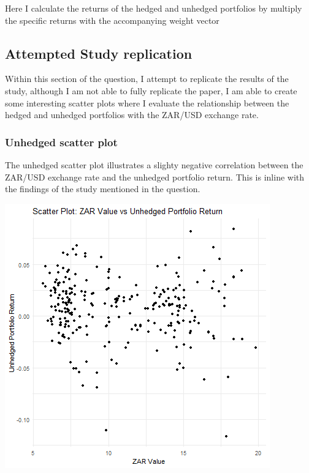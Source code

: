 \documentclass[11pt,preprint, authoryear]{elsarticle}
\let\origfigure\figure
\let\endorigfigure\endfigure
\renewenvironment{figure}[1][2] {
    \expandafter\origfigure\expandafter[H]
} {
    \endorigfigure
}
\numberwithin{equation}{section}
\numberwithin{figure}{section}
\numberwithin{table}{section}
\begin{document}
Here I calculate the returns of the hedged and unhedged portfolios by
multiply the specific returns with the accompanying weight vector

\hypertarget{attempted-study-replication}{%
\subsection{Attempted Study
replication}\label{attempted-study-replication}}

Within this section of the question, I attempt to replicate the results
of the study, although I am not able to fully replicate the paper, I am
able to create some interesting scatter plots where I evaluate the
relationship between the hedged and unhedged portfolios with the ZAR/USD
exchange rate.

\hypertarget{unhedged-scatter-plot}{%
\subsubsection{Unhedged scatter plot}\label{unhedged-scatter-plot}}

The unhedged scatter plot illustrates a slighty negative correlation
between the ZAR/USD exchange rate and the unhedged portfolio return.
This is inline with the findings of the study mentioned in the question.

\begin{figure}[H]

{\centering \includegraphics{Question-2_files/figure-latex/Figure 1-1} 

}

\caption{Unhedged vs ZAR/USD scatter plot \label{Figure1}}\label{fig:Figure 1}
\end{figure}
\end{document}
